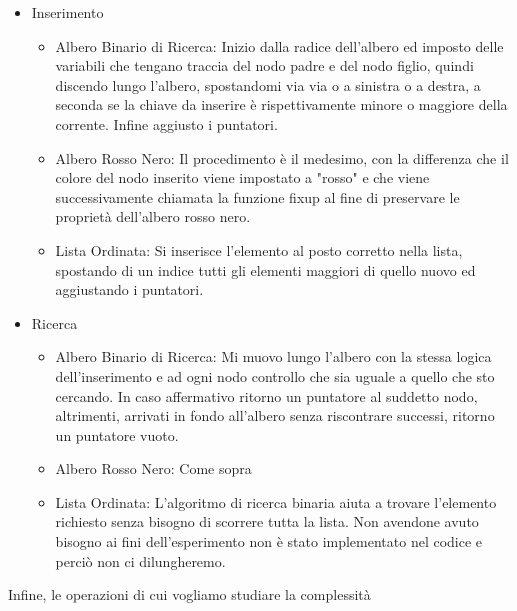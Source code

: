 \begin{itemize}
\item Inserimento
    \begin{itemize}
        \item Albero Binario di Ricerca: Inizio dalla radice dell'albero ed imposto delle variabili che tengano traccia del nodo padre e del nodo figlio, quindi discendo lungo l'albero, spostandomi via via o a sinistra o a destra, a seconda se la chiave da inserire è rispettivamente minore o maggiore della corrente. Infine aggiusto i puntatori.
        \item Albero Rosso Nero: Il procedimento è il medesimo, con la differenza che il colore del nodo inserito viene impostato a "rosso" e che viene successivamente chiamata la funzione fixup al fine di preservare le proprietà dell'albero rosso nero.
        \item Lista Ordinata: Si inserisce l'elemento al posto corretto nella lista, spostando di un indice tutti gli elementi maggiori di quello nuovo ed aggiustando i puntatori.
    \end{itemize}
\item Ricerca
    \begin{itemize}
        \item Albero Binario di Ricerca: Mi muovo lungo l'albero con la stessa logica dell'inserimento e ad ogni nodo controllo che sia uguale a quello che sto cercando. In caso affermativo ritorno un puntatore al suddetto nodo, altrimenti, arrivati in fondo all'albero senza riscontrare successi, ritorno un puntatore vuoto.
        \item Albero Rosso Nero: Come sopra
        \item Lista Ordinata: L'algoritmo di ricerca binaria aiuta a trovare l'elemento richiesto senza bisogno di scorrere tutta la lista. Non avendone avuto bisogno ai fini dell'esperimento non è stato implementato nel codice e perciò non ci dilungheremo.
    \end{itemize}
\end{itemize}

Infine, le operazioni di cui vogliamo studiare la complessità

